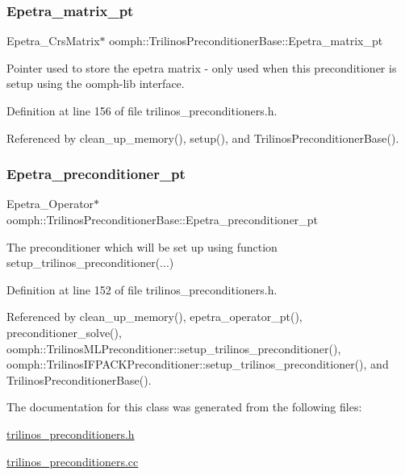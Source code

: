 \subsubsection{\texorpdfstring{Epetra\+\_\+matrix\+\_\+pt}{Epetra\_matrix\_pt}}
{\footnotesize\ttfamily Epetra\+\_\+\+Crs\+Matrix$\ast$ oomph\+::\+Trilinos\+Preconditioner\+Base\+::\+Epetra\+\_\+matrix\+\_\+pt\hspace{0.3cm}{\ttfamily [protected]}}



Pointer used to store the epetra matrix -\/ only used when this preconditioner is setup using the oomph-\/lib interface. 



Definition at line 156 of file trilinos\+\_\+preconditioners.\+h.



Referenced by clean\+\_\+up\+\_\+memory(), setup(), and Trilinos\+Preconditioner\+Base().

\mbox{\label{classoomph_1_1TrilinosPreconditionerBase_a082fb118f5c9cb80daffba53d85a74d8}} 
\subsubsection{\texorpdfstring{Epetra\+\_\+preconditioner\+\_\+pt}{Epetra\_preconditioner\_pt}}
{\footnotesize\ttfamily Epetra\+\_\+\+Operator$\ast$ oomph\+::\+Trilinos\+Preconditioner\+Base\+::\+Epetra\+\_\+preconditioner\+\_\+pt\hspace{0.3cm}{\ttfamily [protected]}}



The preconditioner which will be set up using function setup\+\_\+trilinos\+\_\+preconditioner(...) 



Definition at line 152 of file trilinos\+\_\+preconditioners.\+h.



Referenced by clean\+\_\+up\+\_\+memory(), epetra\+\_\+operator\+\_\+pt(), preconditioner\+\_\+solve(), oomph\+::\+Trilinos\+M\+L\+Preconditioner\+::setup\+\_\+trilinos\+\_\+preconditioner(), oomph\+::\+Trilinos\+I\+F\+P\+A\+C\+K\+Preconditioner\+::setup\+\_\+trilinos\+\_\+preconditioner(), and Trilinos\+Preconditioner\+Base().



The documentation for this class was generated from the following files\+:\begin{DoxyCompactItemize}
\item 
\hyperlink{trilinos__preconditioners_8h}{trilinos\+\_\+preconditioners.\+h}\item 
\hyperlink{trilinos__preconditioners_8cc}{trilinos\+\_\+preconditioners.\+cc}\end{DoxyCompactItemize}

